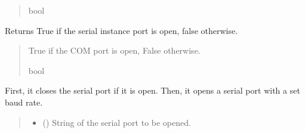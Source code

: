 \documentclass[letterpaper,10pt,english]{sphinxmanual}
\begin{document}
\begin{fulllineitems}
\begin{fulllineitems}
\begin{quote}
\begin{description}
\sphinxAtStartPar
bool

\end{description}\end{quote}

\end{fulllineitems}


\begin{fulllineitems}
\label{\detokenize{SerialCommunication:SerialCommunication.COM_io.IsSerialOpen}}
\pysigstartsignatures
{}
\pysigstopsignatures
\sphinxAtStartPar
Returns True if the serial instance port is open, false otherwise.
\begin{quote}\begin{description}
\sphinxAtStartPar
True if the COM port is open, False otherwise.

\sphinxAtStartPar
bool

\end{description}\end{quote}

\end{fulllineitems}


\begin{fulllineitems}
\label{\detokenize{SerialCommunication:SerialCommunication.COM_io.OpenSerialPort}}
\pysigstartsignatures
{}
\pysigstopsignatures
\sphinxAtStartPar
First, it closes the serial port if it is open. Then, it opens a serial port with a set         baud rate.
\begin{quote}\begin{description}
\begin{itemize}
\item {} 
\sphinxAtStartPar
{} (\sphinxstyleliteralemphasis{\sphinxupquote{ | }}) \textendash{} String of the serial port to be opened.


\end{itemize}
\end{description}
\end{quote}
\end{fulllineitems}
\end{fulllineitems}
\end{document}
